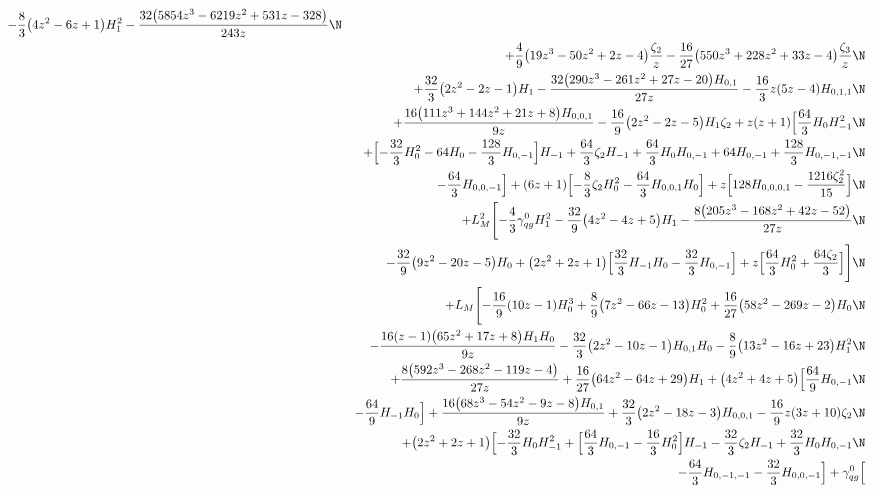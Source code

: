 \begin{eqnarray}
-\frac{8}{3} \big(4 z^2-6 z+1\big) H_1^2
-\frac{32 \big(5854 z^3-6219 z^2+531 z-328\big)}{243 z}
\N\\&&
+\frac{4}{9} \big(19 z^3-50 z^2+2 z-4\big) \frac{\zeta_2}{z}
-\frac{16}{27} \big(550 z^3+228 z^2+33 z-4\big) \frac{\zeta_3}{z}
\N\\&&
+\frac{32}{3} \big(2 z^2-2 z-1\big) H_1
-\frac{32 \big(290 z^3-261 z^2+27 z-20\big) H_{0,1}}{27 z}
-\frac{16}{3} z (5 z-4) H_{0,1,1}
\N\\&&
+\frac{16 \big(111 z^3+144 z^2+21 z+8\big) H_{0,0,1}}{9 z}
-\frac{16}{9} \big(2 z^2-2 z-5\big) H_1 \zeta_2+z (z+1) \Bigl[
\frac{64}{3} H_0 H_{-1}^2
\N\\&&
+\Bigl[
-\frac{32}{3} H_0^2-64 H_0
-\frac{128}{3} H_{0,-1}\Bigr] H_{-1}
+\frac{64}{3} \zeta_2 H_{-1}
+\frac{64}{3} H_0 H_{0,-1}+64 H_{0,-1}
+\frac{128}{3} H_{0,-1,-1}
\N\\&&
-\frac{64}{3} H_{0,0,-1}\Bigr]+(6 z+1) \Bigl[
-\frac{8}{3} \zeta_2 H_0^2
-\frac{64}{3} H_{0,0,1} H_0\Bigr]+z \Bigl[128 H_{0,0,0,1}
-\frac{1216 \zeta_2^2}{15}\Bigr]
\N\\&&
+L_M^2 \Biggl[
-\frac{4}{3} {\gamma}_{qg}^{0} H_1^2
-\frac{32}{9} \big(4 z^2-4 z+5\big) H_1
-\frac{8 \big(205 z^3-168 z^2+42 z-52\big)}{27 z}
\N\\&&
-\frac{32}{9} \big(9 z^2-20 z-5\big) H_0+\big(2 z^2+2 z+1\big) \Bigl[
\frac{32}{3} H_{-1} H_0
-\frac{32}{3} H_{0,-1}\Bigr]+z \Bigl[
\frac{64}{3} H_0^2
+\frac{64 \zeta_2}{3}\Bigr]\Biggr]
\N\\&&
+L_M \Biggl[
-\frac{16}{9} (10 z-1) H_0^3
+\frac{8}{9} \big(7 z^2-66 z-13\big) H_0^2
+\frac{16}{27} \big(58 z^2-269 z-2\big) H_0
\N\\&&
-\frac{16 (z-1) \big(65 z^2+17 z+8\big) H_1 H_0}{9 z}
-\frac{32}{3} \big(2 z^2-10 z-1\big) H_{0,1} H_0
-\frac{8}{9} \big(13 z^2-16 z+23\big) H_1^2
\N\\&&
+\frac{8 \big(592 z^3-268 z^2-119 z-4\big)}{27 z}
+\frac{16}{27} \big(64 z^2-64 z+29\big) H_1
+\big(4 z^2+4 z+5\big) \Bigl[
\frac{64}{9} H_{0,-1}
\N\\&&
-\frac{64}{9} H_{-1} H_0\Bigr]
+\frac{16 \big(68 z^3-54 z^2-9 z-8\big) H_{0,1}}{9 z}
+\frac{32}{3} \big(2 z^2-18 z-3\big) H_{0,0,1}
-\frac{16}{9} z (3 z+10) \zeta_2
\N\\&&
+\big(2 z^2+2 z+1\big) \Bigl[
-\frac{32}{3} H_0 H_{-1}^2+\Bigl[
\frac{64}{3} H_{0,-1}
-\frac{16}{3} H_0^2\Bigr] H_{-1}
-\frac{32}{3} \zeta_2 H_{-1}
+\frac{32}{3} H_0 H_{0,-1}
\N\\&&
-\frac{64}{3} H_{0,-1,-1}
-\frac{32}{3} H_{0,0,-1}\Bigr]
+{\gamma}_{qg}^{0} \Bigl[

\end{eqnarray}
